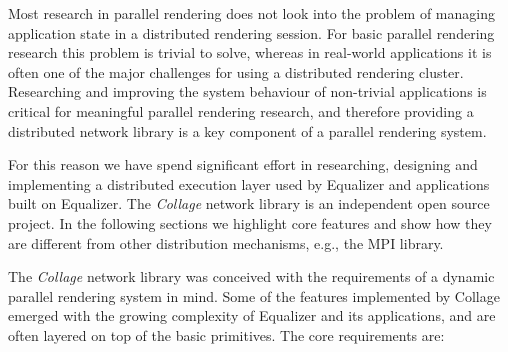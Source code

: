 Most research in parallel rendering does not look into the problem of managing
application state in a distributed rendering session. For basic parallel
rendering research this problem is trivial to solve, whereas in real-world
applications it is often one of the major challenges for using a distributed
rendering cluster. Researching and improving the system behaviour of
non-trivial applications is critical for meaningful parallel rendering
research, and therefore providing a distributed network library is a key
component of a parallel rendering system.

For this reason we have spend significant effort in researching, designing and
implementing a distributed execution layer used by Equalizer and
applications built on Equalizer. The {\em Collage} network library is an
independent open source project. In the following sections we highlight core
features and show how they are different from other distribution mechanisms,
e.g., the MPI library.

The {\em Collage} network library was conceived with the requirements of a dynamic
parallel rendering system in mind. Some of the features implemented by Collage
emerged with the growing complexity of Equalizer and its applications, and are
often layered on top of the basic primitives. The core requirements are:

